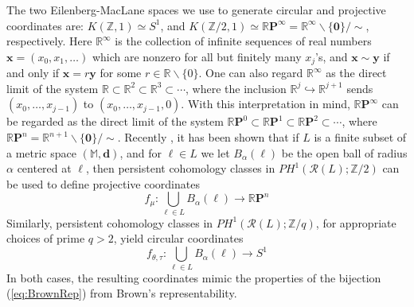 \documentclass[11pt]{article}
\theoremstyle{definition}
\theoremstyle{remark}
\newcommand{\RR}{\mathbb{R}}
\newcommand{\ZZ}{\mathbb{Z}}
\newcommand{\MM}{\mathbb{M}}
\newcommand{\RP}{\mathbb{R}\mathbf{P}}
\begin{document}
    The two Eilenberg-MacLane spaces we use to generate circular and projective coordinates are:
    $K(\ZZ,1) \simeq S^1$, and  $K(\ZZ/2, 1) \simeq \RP^\infty = \RR^\infty \smallsetminus\{\mathbf{0}\}/\sim$, respectively.
    Here
    $\RR^\infty$ is the collection of infinite sequences of real numbers
    $\mathbf{x} = (x_0, x_1 , \ldots)$ which are nonzero for all but finitely many $x_j$'s, and
    $\mathbf{x} \sim \mathbf{y}$ if and only if $\mathbf{x} = r\mathbf{y}$
    for some $r\in \RR\smallsetminus\{0\}$.
    One can also regard $\RR^\infty$  as  the direct limit of the system  $\RR \subset \RR^2 \subset \RR^3 \subset \cdots$,
    where the inclusion $\RR^j \hookrightarrow \RR^{j+1}$ sends
    $(x_0,\ldots, x_{j-1})$ to $(x_0,\ldots, x_{j-1},0)$.
    With this interpretation in mind,  $\RP^\infty$ can be regarded as the direct limit of the system $\RP^0 \subset \RP^1 \subset \RP^2 \subset \cdots $,
    where $\RP^n = \RR^{n+1}\smallsetminus \{\mathbf{0}\}/\sim$.
    Recently \cite{perea2018multiscale}, it has been shown that if $L$ is a finite subset of a metric space
    $(\MM,\mathbf{d})$,
    and for $\ell \in L$ we let $B_\alpha (\ell)$ be the open ball of radius $\alpha$ centered at $\ell$,
    then persistent cohomology classes in $PH^1(\mathcal{R}(L);\ZZ/2)$ can be used to define projective coordinates
    \[
    f_\mu : \bigcup\limits_{\ell \in L} B_{\alpha}(\ell) \longrightarrow \RP^n
    \]
    Similarly,  persistent cohomology classes in $PH^1(\mathcal{R}(L); \ZZ/q)$, for appropriate choices of prime $q>2$, yield circular coordinates \cite{perea2018circular}
    \[
    f_{\theta, \tau}: \bigcup\limits_{\ell \in L} B_{\alpha}(\ell ) \longrightarrow S^1
    \]
    In both cases, the resulting coordinates mimic the properties of the bijection (\ref{eq:BrownRep}) from Brown's representability.
\end{document}
